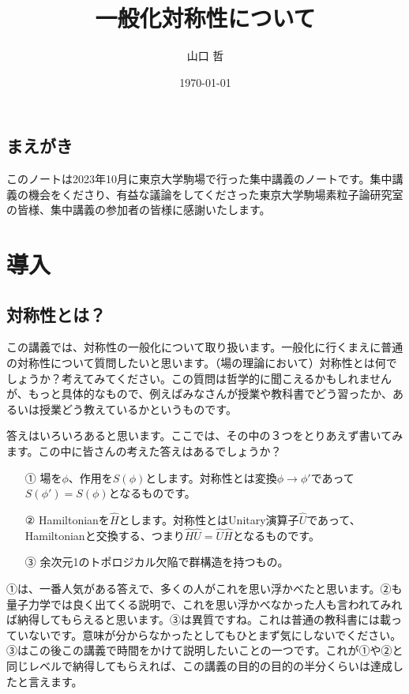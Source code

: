 \documentclass[report,paper=a4, fontsize=12pt, line_length=16cm, number_of_lines=33,dvipdfmx]{jlreq}
\title{一般化対称性について}
\author{山口 哲}
\date{\today}
\numberwithin{equation}{chapter}
\newcommand{\Hh}{\widehat{H}}
\newcommand{\Uh}{\widehat{U}}
\begin{document}
\maketitle
\tableofcontents

\section*{まえがき}

このノートは2023年10月に東京大学駒場で行った集中講義のノートです。集中講義の機会をくださり、有益な議論をしてくださった東京大学駒場素粒子論研究室の皆様、集中講義の参加者の皆様に感謝いたします。

\chapter{導入}
\section{対称性とは？}

この講義では、対称性の一般化について取り扱います。一般化に行くまえに普通の対称性について質問したいと思います。（場の理論において）対称性とは何でしょうか？考えてみてください。この質問は哲学的に聞こえるかもしれませんが、もっと具体的なもので、例えばみなさんが授業や教科書でどう習ったか、あるいは授業どう教えているかというものです。

答えはいろいろあると思います。ここでは、その中の３つをとりあえず書いてみます。この中に皆さんの考えた答えはあるでしょうか？
\begin{itemize}
  \item[①] 場を$\phi$、作用を$S(\phi)$とします。対称性とは変換$\phi\to\phi'$であって$S(\phi')=S(\phi)$となるものです。
  \item[②] Hamiltonianを$\Hh$とします。対称性とはUnitary演算子$\Uh$であって、Hamiltonianと交換する、つまり$\Hh \Uh =\Uh \Hh$となるものです。
  \item[③] 余次元1のトポロジカル欠陥で群構造を持つもの。  
\end{itemize}
①は、一番人気がある答えで、多くの人がこれを思い浮かべたと思います。②も量子力学では良く出てくる説明で、これを思い浮かべなかった人も言われてみれば納得してもらえると思います。③は異質ですね。これは普通の教科書には載っていないです。意味が分からなかったとしてもひとまず気にしないでください。③はこの後この講義で時間をかけて説明したいことの一つです。これが①や②と同じレベルで納得してもらえれば、この講義の目的の目的の半分くらいは達成したと言えます。
\end{document}
